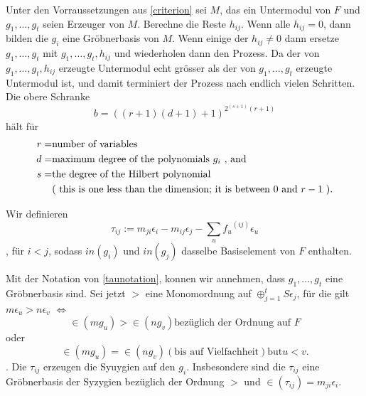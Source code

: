 \documentclass{article}
\begin{document}
\begin{algo}
	Unter den Vorraussetzungen aus \ref{criterion} 
	sei
	\( M \),
	das ein Untermodul von
	\( F \)
	und 
	\( g_{1},\dots,g_{t}\)
	seien  Erzeuger von 
	\( M \).
	Berechne die Reste
	\( h_{ij} \).
	Wenn alle 
	\( h_{ij} = 0 \),
	dann bilden die 
	\(g_{i} \)
	eine Gr\"obnerbasis von 
	\( M \).
	Wenn einige der 
	\( h_{ij} \neq 0 \)
	dann ersetze 
	\( g_{1},\dots,g_{t}\)
	mit 
	\( g_{1},\dots,g_{t},h_{ij} \)
	und wiederholen dann den Prozess.
	Da der von
	\( g_{1},\dots,g_{t},h_{ij} \)
	erzeugte Untermodul echt gr\"osser als der von
	\( g_{1},\dots,g_{t}\)
	erzeugte Untermodul ist, 
	und damit terminiert der Prozess nach endlich vielen Schritten.
	Die obere Schranke 
	\[
		b=\left( 
			\left( r+1 \right)
			\left( d+1 \right)+1 
		\right)^{2^{(s+1)}(r+1) }
	\]	
	h\"alt f\"ur
	\begin{align*}	
		r = &\text{number of variables} \\
		d = &\text{maximum degree of the polynomials \( g_i\) , and } \\
		s = &\text{the degree of the Hilbert polynomial } \\
		    &\text{( this is one less than the dimension; it is between \( 0 \) and \(r-1\) ).}
	\end{align*}

\end{algo}
\begin{defn}
	Wir definieren
	\[
		\tau_{ij}:=
		m_{ji}\epsilon_{i} - 
		m_{ij} \epsilon_{j} - 
		\sum_{u} {f_{u}}^{\left( ij \right) } 
		\epsilon_{u} 
	\],
	f\"ur
	\( i < j \),
	sodass 
	\( in \left( g_{i}  \right) \)
	und
	\( in \left( g_{j}  \right) \)
	dasselbe Basiselement von \( F \)
	enthalten.
\end{defn}
\begin{thm}[Schreyer \cite{Eis1}[15.10]
	Mit der Notation von \ref{taunotation}, 
	konnen wir annehmen,
	dass
	\( g_1,\dots,g_t\)
	eine Gr\"obnerbasis sind.
	Sei jetzt 
	\( > \) 
	eine Monomordnung auf 
	\( \oplus_{j=1}^t S \epsilon_{j} \),
	f\"ur die gilt
	\( m \epsilon_{u} > n \epsilon_{v} \)
	\(\iff\)
	\[
		\in\left(  m g_{u} \right) > \in\left( n g_{v} \right) 
		\text{bez\"uglich der Ordnung auf } F 
	\]
	oder
	\[
		\in\left( m g_{u} \right) = \in\left( n g_{v} \right) 
		\left( \text{bis auf Vielfachheit} \right) \text{but} u < v.
	\].
	Die
	\( \tau_{ij} \) 
	erzeugen die Syuygien auf den
	\( g_{i} \).
	Insbesondere sind die
	\( \tau_{ij} \)
	eine Gr\"obnerbasis der Syzygien bez\"uglich der Ordnung
	\( > \)
	und 
	\( \in\left( \tau_{ij} \right) = m_{ji}\epsilon_{i}.\)
\end{thm}
\end{document}
